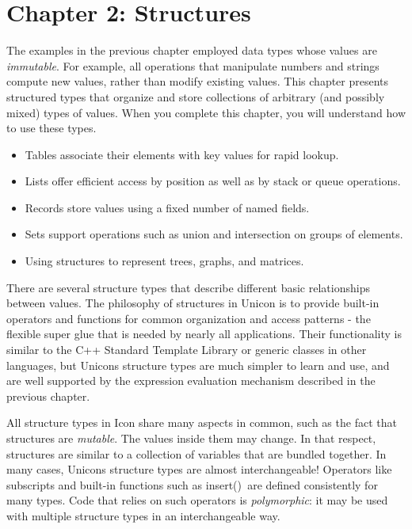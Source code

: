 \clearpage\section{Chapter 2: Structures}

The examples in the previous chapter employed data types whose values
are \textit{immutable}. For example, all operations that manipulate
numbers and strings compute new values, rather than modify existing
values. This chapter presents structured types that organize and store
collections of arbitrary (and possibly mixed) types of values. When you
complete this chapter, you will understand how to use these types.


\begin{itemize}
\item Tables associate their elements with key values for rapid lookup.
\item Lists offer efficient access by position as well as by
stack or queue operations.
\item Records store values using a fixed number of named fields.
\item Sets support operations such as union and intersection on groups
of elements.
\item Using structures to represent trees, graphs, and
matrices.
\end{itemize}
There are several structure types that describe different basic
relationships between values. The philosophy of structures in Unicon is
to provide built-in operators and functions for common organization and
access patterns - the flexible {\textquotedbl}super glue{\textquotedbl}
that is needed by nearly all applications. Their functionality is
similar to the C++ Standard Template Library or generic classes in
other languages, but Unicon{\textquotesingle}s structure types are much
simpler to learn and use, and are well supported by the expression
evaluation mechanism described in the previous chapter.

All structure types in Icon share many aspects in common, such as the
fact that structures are \textit{mutable}. The
values inside them may change. In that respect, structures are similar
to a collection of variables that are bundled together. In many cases,
Unicon{\textquotesingle}s structure types are almost interchangeable!
Operators like subscripts and built-in functions such as
\textsf{insert()}\texttt{ }are defined consistently for
many types. Code that relies on such operators is
\textit{polymorphic}: it may be used with multiple
structure types in an interchangeable way.

